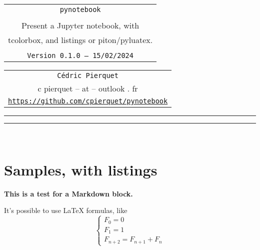 \documentclass[english,11pt,a4paper]{article}
\def\TPversion{0.1.0}
\def\TPdate{15/02/2024}
\begin{document}
\pagestyle{fancy}

\thispagestyle{empty}

\begin{center}
	\begin{minipage}{0.88\linewidth}
	\begin{tcolorbox}[colframe=yellow,colback=yellow!15]
		\begin{center}
			\begin{tabular}{c}
				{\Huge \texttt{pynotebook}}\\
				\\
				{\LARGE Present a Jupyter notebook, with} \\
				{\LARGE tcolorbox, and listings or piton/pyluatex.} \\
				\\
				{\small \texttt{Version \TPversion{} -- \TPdate}}
		\end{tabular}
		\end{center}
	\end{tcolorbox}
\end{minipage}
\end{center}

\begin{center}
	\begin{tabular}{c}
	\texttt{Cédric Pierquet}\\
	{\ttfamily c pierquet -- at -- outlook . fr}\\
	\texttt{\url{https://github.com/cpierquet/pynotebook}}
\end{tabular}
\end{center}

\hrule


\hypertarget{matoc}{}

\tableofcontents

\vspace*{5mm}

\hrule

\vspace*{5mm}

\vfill~

\pagebreak

\section{Samples, with listings}

\begin{NotebookMarkdown}{\linewidth}
{\Large\bfseries This is a test for a \textsf{Markdown} block.}

It's possible to use \LaTeX{} formulas, like %
\[
\left\lbrace\begin{array}{l}
	F_0 = 0\\
	F_1 = 1 \\
	F_{n+2} = F_{n+1} + F_n
\end{array}\right.
\]
\end{NotebookMarkdown}
\end{document}
